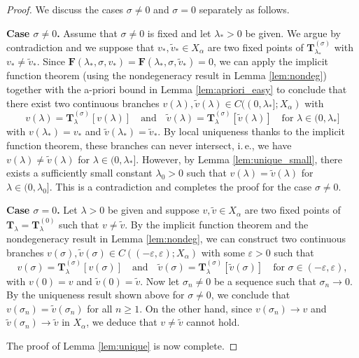 \documentclass[reqno,10pt,a4paper]{amsart}
\theoremstyle{definition}
\theoremstyle{definition}
\theoremstyle{remark}
\theoremstyle{remark}
\numberwithin{equation}{section}
\newcommand{\eps}{\varepsilon}
\newcommand{\Ts}{\mathbf{T}}
\newcommand{\Fs}{\mathbf{F}}
\begin{document}
\begin{proof}
We discuss the cases $\sigma \neq 0$ and $\sigma=0$ separately as follows.

\medskip
\textbf{Case $\sigma \neq 0$.} Assume that $\sigma \neq 0$ is fixed and let $\lambda_* > 0$ be given. We argue by contradiction and we suppose that $v_*, \tilde{v}_* \in X_\alpha$ are two fixed points of $\Ts_{\lambda_*}^{(\sigma)}$ with $v_* \neq \tilde{v}_*$. Since $\Fs(\lambda_*, \sigma, v_*)=\Fs(\lambda_*, \sigma, \tilde{v}_*)=0$, we can apply the implicit function theorem (using the nondegeneracy result in Lemma \ref{lem:nondeg}) together with the a-priori bound in Lemma \ref{lem:apriori_easy} to conclude that there exist two continuous branches $v(\lambda), \tilde{v}(\lambda) \in C((0, \lambda_*]; X_\alpha)$ with
$$
v(\lambda) = \Ts_{\lambda}^{(\sigma)}[v(\lambda)] \quad \mbox{and} \quad \tilde{v}(\lambda) = \Ts_{\lambda}^{(\sigma)}[\tilde{v}(\lambda)] \quad \mbox{for $\lambda \in (0, \lambda_*]$}
$$
with $v(\lambda_*) = v_*$ and $\tilde{v}(\lambda_*) = \tilde{v}_*$. By local uniqueness thanks to the implicit function theorem, these branches can never intersect, i.\,e., we have $v(\lambda) \neq \tilde{v}(\lambda)$ for $\lambda \in (0, \lambda_*]$. However, by Lemma \ref{lem:unique_small}, there exists a sufficiently small constant $\lambda_0 > 0$ such that $v(\lambda) = \tilde{v}(\lambda)$ for $\lambda \in (0, \lambda_0]$. This is a contradiction and completes the proof for the case $\sigma \neq 0$.

\medskip
\textbf{Case $\sigma =0$.} Let $\lambda >0$ be given and suppose $v, \tilde{v} \in X_\alpha$ are two fixed points of $\Ts_\lambda=\Ts_{\lambda}^{(0)}$ such that $v \neq \tilde{v}$. By the implicit function theorem and the nondegeneracy result in Lemma \ref{lem:nondeg}, we can construct two continuous branches $v(\sigma), \tilde{v}(\sigma) \in C((-\eps, \eps); X_\alpha)$ with some $\eps > 0$ such that
$$
v(\sigma) = \Ts_{\lambda}^{(\sigma)}[v(\sigma)] \quad \mbox{and} \quad \tilde{v}(\sigma) = \Ts_{\lambda}^{(\sigma)}[\tilde{v}(\sigma)] \quad \mbox{for $\sigma \in (-\eps,\eps)$},
$$  
with $v(0) = v$ and $\tilde{v}(0) = \tilde{v}$. Now let $\sigma_n \neq 0$ be a sequence such that $\sigma_n \to 0$. By the uniqueness result shown above for $\sigma \neq 0$, we conclude that $v(\sigma_n) = \tilde{v}(\sigma_n)$ for all $n \geq 1$. On the other hand, since $v(\sigma_n) \to v$ and $\tilde{v}(\sigma_n) \to \tilde{v}$ in $X_\alpha$, we deduce that $v \neq \tilde{v}$ cannot hold. 

The proof of Lemma \ref{lem:unique} is now complete.
\end{proof}
\end{document}
